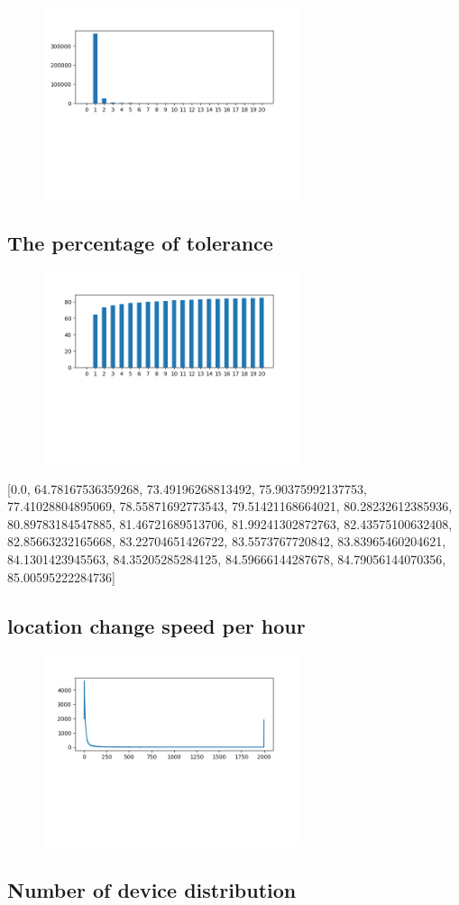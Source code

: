 \documentclass[10pt, conference, compsocconf]{IEEEtran}
\begin{document}
\begin{figure}[H]\centering\includegraphics[width=75mm,scale=0.5]{BasedonClientIDnumberofusersfingerprint}\end{figure}\subsection{The percentage of tolerance}
\begin{figure}[H]\centering\includegraphics[width=75mm,scale=0.5]{BasedonClientIDtolerance}\end{figure}[0.0, 64.78167536359268, 73.49196268813492, 75.90375992137753, 77.41028804895069, 78.55871692773543, 79.51421168664021, 80.28232612385936, 80.89783184547885, 81.46721689513706, 81.99241302872763, 82.43575100632408, 82.85663232165668, 83.22704651426722, 83.5573767720842, 83.83965460204621, 84.1301423945563, 84.35205285284125, 84.59666144287678, 84.79056144070356, 85.00595222284736]\subsection{location change speed per hour}
\begin{figure}[H]\centering\includegraphics[width=75mm,scale=0.5]{BasedonClientIDlocationchange}\end{figure}\subsection{Number of device distribution}
\end{document}

